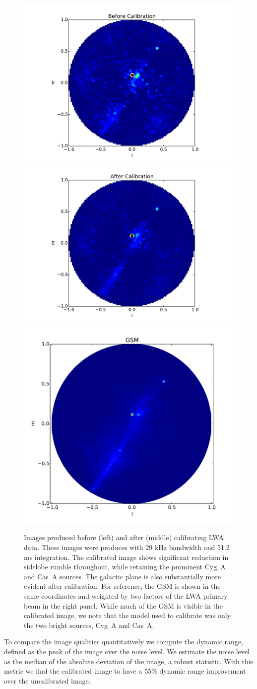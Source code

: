 \documentclass[a4paper,fleqn,usenatbib]{../mnras}
\begin{document}
\begin{figure}
\begin{center}
\includegraphics[width=0.33\linewidth]{figures/cal_paper_data_image_before.pdf}
\includegraphics[width=0.33\linewidth]{figures/cal_paper_data_image_after.pdf}
\includegraphics[width=0.33\linewidth]{figures/cal_paper_gsm_beam_weighted.pdf}
\caption{Images produced before (left) and after (middle) calibrating LWA data. These images were produces with 29 kHz bandwidth and 51.2 ms integration. The calibrated image shows significant reduction in sidelobe rumble throughout, while retaining the prominent Cyg~A and Cas~A sources. The galactic plane is also substantially more evident after calibration. For reference, the GSM is shown in the same coordinates and weighted by two factors of the LWA primary beam in the right panel. While much of the GSM is visible in the calibrated image, we note that the model used to calibrate was only the two bright sources, Cyg~A and Cas~A.
}
\label{fig:data_images}
\end{center}
\end{figure}

To compare the image qualities quantitatively we compute the dynamic range, defined as the peak of the image over the noise level. We estimate the noise level as the median of the absolute deviation of the image, a robust statistic. With this metric we find the calibrated image to have a 55\% dynamic range improvement over the uncalibrated image.
\end{document}
